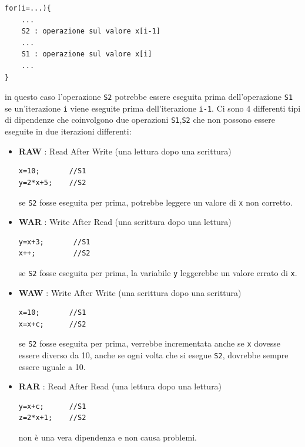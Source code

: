 \documentclass[10pt, letterpaper]{report}
\begin{document}
\begin{lstlisting}[style=CStyle]
for(i=...){
    ... 
    S2 : operazione sul valore x[i-1]
    ... 
    S1 : operazione sul valore x[i]
    ...
}
\end{lstlisting}
in questo caso l'operazione \texttt{S2} potrebbe essere eseguita prima dell'operazione \texttt{S1} se un'iterazione \texttt{i} viene eseguite prima dell'iterazione \texttt{i-1}. \acc 
Ci sono 4 differenti tipi di dipendenze che coinvolgono due operazioni \texttt{S1},\texttt{S2} che non possono essere eseguite in due iterazioni differenti:\begin{itemize}
    \item \textbf{RAW} : Read After Write (una lettura dopo una scrittura)
\begin{lstlisting}[style=CStyle]
x=10;       //S1
y=2*x+5;    //S2
\end{lstlisting}
    se \texttt{S2} fosse eseguita per prima, potrebbe leggere un valore di \texttt{x} non corretto.
    \item \textbf{WAR} : Write After Read (una scrittura dopo una lettura)
\begin{lstlisting}[style=CStyle]
y=x+3;       //S1
x++;         //S2
\end{lstlisting}
    se \texttt{S2} fosse eseguita per prima, la variabile \texttt{y} leggerebbe un valore errato di \texttt{x}.
    \item \textbf{WAW} : Write After Write (una scrittura dopo una scrittura)
\begin{lstlisting}[style=CStyle]
x=10;       //S1
x=x+c;      //S2
\end{lstlisting}
        se \texttt{S2} fosse eseguita per prima, verrebbe incrementata anche se \texttt{x} dovesse essere diverso da 10, anche se ogni volta che si esegue \texttt{S2}, dovrebbe sempre essere uguale a 10.
    \item \textbf{RAR} : Read After Read (una lettura dopo una lettura)
\begin{lstlisting}[style=CStyle]
y=x+c;      //S1
z=2*x+1;    //S2
\end{lstlisting}
non è una vera dipendenza e non causa problemi.
\end{itemize}
\end{document}
